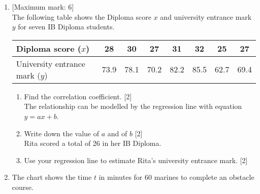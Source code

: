 \documentclass[12pt, twoside]{article}
\begin{document}
\begin{enumerate}
\newpage 
    \item {[Maximum mark: 6]} \\[0.3cm]
    The following table shows the Diploma score $x$ and university entrance mark $y$ for seven IB Diploma students. 
            \begin{center}
            \begin{tabular}{|l|c|c|c|c|c|c|c|}
                \hline
                Diploma score ($x$) & 28 & 30 & 27 & 31 & 32 & 25 & 27 \\ 
                \hline 
                University entrance mark ($y$) & 73.9 & 78.1 & 70.2 & 82.2 & 85.5 & 62.7 & 69.4 \\ 
                \hline 
                \end{tabular}
            \end{center}
            \begin{enumerate}
                \item Find the correlation coefficient. \hfill [2]\\[0.25cm]
                The relationship can be modelled by the regression line with equation $y=ax+b$.
                \item Write down the value of $a$ and of $b$ \hfill [2]\\[0.25cm]
                Rita scored a total of 26 in her IB Diploma.
                \item Use your regression line to estimate Rita's university entrance mark. \hfill [2]
            \end{enumerate}
\newpage
    \item The chart shows the time $t$ in minutes for 60 marines to complete an obstacle course.

    \begin{center}
    \end{center}


\end{enumerate}
\end{document}

